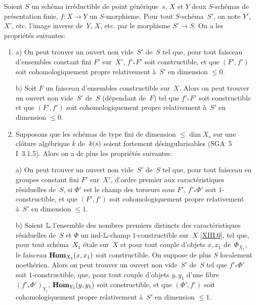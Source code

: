 \begin{theoreme}
\label{XIII.3.1}
Soient $S$ un sch\'ema irr\'eductible de point
g\'en\'erique~$s$, $X$ et $Y$ deux $S$-sch\'emas de
pr\'esentation finie, $f\colon X \to Y$ un $S$-morphisme. Pour tout
$S$-sch\'ema~$S'$, on note $Y'$, $X'$, etc. l'image inverse de~$Y$,
$X$, etc. par le morphisme $S' \to S$. On a les propri\'et\'es
suivantes:

\begin{enumerate}
\item[1)]
{\upshape a)} On peut trouver un ouvert non vide~$S'$ de~$S$ tel que, pour
tout faisceau d'ensembles constant fini $F'$ sur~$X'$, $f'_*F'$ soit
constructible, et que $(F',f')$ soit cohomologiquement propre
relativement \`a~$S'$ en dimension $\le 0$.

{\upshape b)} Soit $F$ un faisceau d'ensembles constructible sur~$X$. Alors
on peut trouver un ouvert non vide~$S'$ de~$S$ (d\'ependant de~$F$)
tel que $f'_*F'$ soit constructible et que $(F',f')$ soit
cohomologiquement propre relativement \`a~$S'$ en dimension $\le 0$.

\item[2)] Supposons que les sch\'emas de type fini de dimension $\le
\dim X_s$ sur une cl\^oture alg\'ebrique $\overline{k}$ de~$\mathit{k}(s)$
soient fortement d\'esingularisables \textup{(SGA~5 I~3.1.5)}. Alors on a de
plus les propri\'et\'es suivantes:

{\upshape a)} On peut trouver un ouvert non vide~$S'$ de~$S$ tel que, pour
tout faisceau en groupes constant fini $F'$ sur~$X'$, d'ordre premier
aux caract\'eristiques r\'esiduelles de~$S$, si $\Phi'$ est le
champ des torseurs sous $F'$, $f'_*\Phi'$ soit $1$-constructible, et
que $(F',f')$ soit cohomologiquement propre relativement \`a~$S'$ en
dimension $\le 1$.

{\upshape b)} Soient $\mathbb{L}$ l'ensemble des nombres premiers distincts des
caract\'eristiques r\'esiduelles de~$S$ et $\Phi$ un
ind-$\mathbb{L}$-champ $1$-constructible sur~$X$ \eqref{XIII.0}, tel que,
pour tout sch\'ema~$X_1$ \'etale sur~$X$ et pour tout couple
d'objets $x, x_1$ de~$\Phi_{X_1}$, le faisceau $\operatorname{\mathbf{Hom}}
_{X_1}(x,x_1)$ soit constructible. On suppose de plus $S$ localement
noeth\'erien. Alors on peut trouver un ouvert non vide~$S'$ de~$S$
tel que $f'_*\Phi'$ soit $1$-constructible, que, pour tout couple
d'objets $y, y_1$ d'une fibre $(f'_*\Phi')_{Y_1}$,
$\operatorname{\mathbf{Hom}}_{Y_1}(y,y_1)$ soit constructible,
et que $(\Phi',f')$ soit cohomologiquement propre relativement \`a~$S'$ en dimension $\le 1$.
\end{enumerate}
\end{theoreme}

